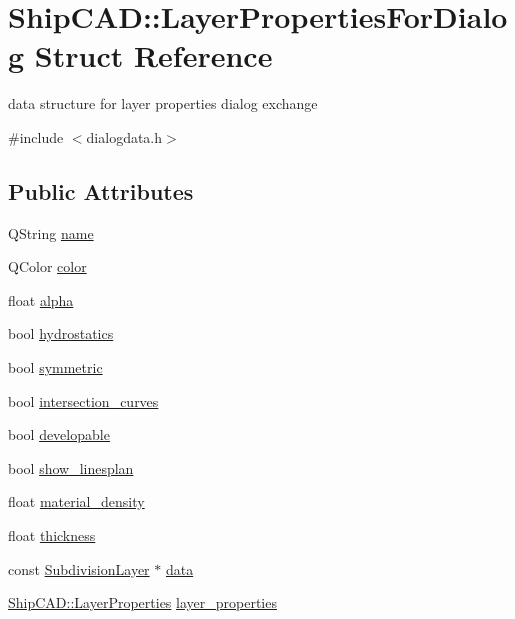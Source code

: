 \hypertarget{structShipCAD_1_1LayerPropertiesForDialog}{}\section{Ship\+C\+AD\+:\+:Layer\+Properties\+For\+Dialog Struct Reference}
\label{structShipCAD_1_1LayerPropertiesForDialog}


data structure for layer properties dialog exchange  




{\ttfamily \#include $<$dialogdata.\+h$>$}

\subsection*{Public Attributes}
\begin{DoxyCompactItemize}
\item 
Q\+String \hyperlink{structShipCAD_1_1LayerPropertiesForDialog_a09578942af620f75d1599887672ec8da}{name}
\item 
Q\+Color \hyperlink{structShipCAD_1_1LayerPropertiesForDialog_a20a555fd2c477f691cc04a4fe9b7f6b0}{color}
\item 
float \hyperlink{structShipCAD_1_1LayerPropertiesForDialog_a8ecd6d4c933122d9f3c8f3c8fcf54781}{alpha}
\item 
bool \hyperlink{structShipCAD_1_1LayerPropertiesForDialog_a2ac6ce1339e9dfc028016c5bacea3cae}{hydrostatics}
\item 
bool \hyperlink{structShipCAD_1_1LayerPropertiesForDialog_a3acf39b44721d89ea8906052cc0bedde}{symmetric}
\item 
bool \hyperlink{structShipCAD_1_1LayerPropertiesForDialog_a6003cb18c39e66df709658c14203d066}{intersection\+\_\+curves}
\item 
bool \hyperlink{structShipCAD_1_1LayerPropertiesForDialog_ab2610addf8f227b9b9f00e9f275f6342}{developable}
\item 
bool \hyperlink{structShipCAD_1_1LayerPropertiesForDialog_a7df2aaba3b7824534100f46546d9479e}{show\+\_\+linesplan}
\item 
float \hyperlink{structShipCAD_1_1LayerPropertiesForDialog_a1d0c75ad5128b805bf99aab57212127f}{material\+\_\+density}
\item 
float \hyperlink{structShipCAD_1_1LayerPropertiesForDialog_aeeae5cf44e195fe6f70d4f09a4fa3fef}{thickness}
\item 
const \hyperlink{classShipCAD_1_1SubdivisionLayer}{Subdivision\+Layer} $\ast$ \hyperlink{structShipCAD_1_1LayerPropertiesForDialog_a0bcd4eb69a1b82c26e9dfcf1707cf850}{data}
\item 
\hyperlink{structShipCAD_1_1LayerProperties}{Ship\+C\+A\+D\+::\+Layer\+Properties} \hyperlink{structShipCAD_1_1LayerPropertiesForDialog_a3175b253fd29d654cafe5b359f34a2b4}{layer\+\_\+properties}
\end{DoxyCompactItemize}


